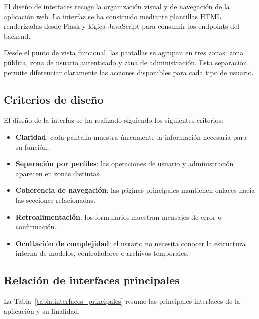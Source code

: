 El diseño de interfaces recoge la organización visual y de navegación de la aplicación web. La interfaz se ha construido mediante plantillas HTML renderizadas desde Flask y lógica JavaScript para consumir los endpoints del backend.

Desde el punto de vista funcional, las pantallas se agrupan en tres zonas: zona pública, zona de usuario autenticado y zona de administración. Esta separación permite diferenciar claramente las acciones disponibles para cada tipo de usuario.

\subsection{Criterios de diseño}

El diseño de la interfaz se ha realizado siguiendo los siguientes criterios:

\begin{itemize}
	\setlength{\itemsep}{0.25em}
	\item \textbf{Claridad}: cada pantalla muestra únicamente la información necesaria para su función.
	\item \textbf{Separación por perfiles}: las operaciones de usuario y administración aparecen en zonas distintas.
	\item \textbf{Coherencia de navegación}: las páginas principales mantienen enlaces hacia las secciones relacionadas.
	\item \textbf{Retroalimentación}: los formularios muestran mensajes de error o confirmación.
	\item \textbf{Ocultación de complejidad}: el usuario no necesita conocer la estructura interna de modelos, controladores o archivos temporales.
\end{itemize}

\subsection{Relación de interfaces principales}

La Tabla~\ref{tabla:interfaces_principales} resume las principales interfaces de la aplicación y su finalidad.

